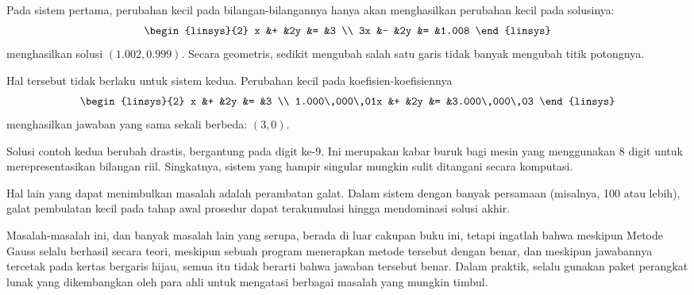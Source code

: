 Pada sistem pertama, perubahan kecil pada bilangan-bilangannya hanya akan
menghasilkan perubahan kecil pada solusinya:
\begin{equation*}
 \begin{linsys}{2}
  x  &+  &2y &= &3                  \\
  3x &-  &2y &= &1.008
 \end{linsys}
\end{equation*}
menghasilkan solusi \( (1.002,0.999) \).
Secara geometris, sedikit mengubah salah satu garis tidak banyak mengubah
titik potongnya.

Hal tersebut tidak berlaku untuk sistem kedua.
Perubahan kecil pada koefisien-koefisiennya
\begin{equation*}
 \begin{linsys}{2}
   x              &+ &2y  &=  &3                  \\
  1.000\,000\,01x &+ &2y  &=  &3.000\,000\,03
 \end{linsys}
\end{equation*}
menghasilkan jawaban yang sama sekali berbeda: \( (3,0) \).

Solusi contoh kedua
berubah drastis, bergantung pada digit ke-\( 9 \).
Ini merupakan kabar buruk bagi mesin yang menggunakan \( 8 \) digit untuk merepresentasikan bilangan riil.
Singkatnya, sistem yang hampir singular mungkin sulit
ditangani secara komputasi.

Hal lain yang dapat menimbulkan masalah adalah perambatan galat.
Dalam sistem dengan banyak persamaan (misalnya, 100 atau lebih), galat
pembulatan kecil pada tahap awal prosedur dapat terakumulasi hingga mendominasi
solusi akhir.

Masalah-masalah ini, dan banyak masalah lain yang serupa,
berada di luar cakupan buku ini, tetapi ingatlah bahwa
meskipun Metode Gauss selalu berhasil secara teori, meskipun
sebuah program menerapkan metode tersebut dengan benar,
dan meskipun jawabannya tercetak pada kertas bergaris hijau, semua itu tidak
berarti bahwa jawaban tersebut benar.
Dalam praktik, selalu gunakan paket perangkat lunak
yang dikembangkan oleh para ahli untuk mengatasi berbagai masalah yang mungkin timbul.
%
